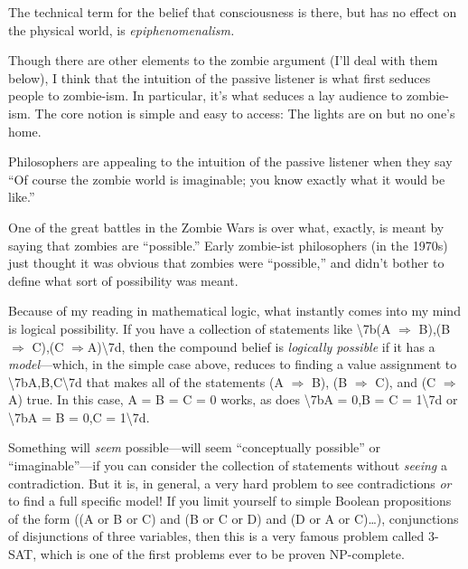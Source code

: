 {
 The technical term for the belief that consciousness is there, but
has no effect on the physical world, is \textit{epiphenomenalism.}}

{
 Though there are other elements to the zombie argument
(I'll deal with them below), I think that the intuition
of the passive listener is what first seduces people to zombie-ism. In
particular, it's what seduces a lay audience to
zombie-ism. The core notion is simple and easy to access: The lights
are on but no one's home.}

{
 Philosophers are appealing to the intuition of the passive
listener when they say ``Of course the zombie world is
imaginable; you know exactly what it would be
like.''}

{
 One of the great battles in the Zombie Wars is over what, exactly,
is meant by saying that zombies are
``possible.'' Early zombie-ist
philosophers (in the 1970s) just thought it was obvious that zombies
were ``possible,'' and
didn't bother to define what sort of possibility was
meant.}

{
 Because of my reading in mathematical logic, what instantly comes
into my mind is logical possibility. If you have a collection of
statements like {\textbackslash}{\textquotesingle}7b(A $\Rightarrow $
B),(B $\Rightarrow $ C),(C $\Rightarrow
${\textlnot}A){\textbackslash}{\textquotesingle}7d, then the compound
belief is \textit{logically possible} if it has a
\textit{model}{}---which, in the simple case above, reduces to finding
a value assignment to
{\textbackslash}{\textquotesingle}7bA,B,C{\textbackslash}{\textquotesingle}7d
that makes all of the statements (A $\Rightarrow $ B), (B $\Rightarrow
$ C), and (C $\Rightarrow ${\textlnot}A) true. In this case, A = B = C
= 0 works, as does {\textbackslash}{\textquotesingle}7bA = 0,B = C =
1{\textbackslash}{\textquotesingle}7d or
{\textbackslash}{\textquotesingle}7bA = B = 0,C =
1{\textbackslash}{\textquotesingle}7d.}

{
 Something will \textit{seem} possible---will seem
``conceptually possible'' or
``imaginable''---if you can consider
the collection of statements without \textit{seeing} a contradiction.
But it is, in general, a very hard problem to see contradictions
\textit{or} to find a full specific model! If you limit yourself to
simple Boolean propositions of the form ((A or B or C) and (B or
{\textlnot}C or D) and (D or {\textlnot}A or {\textlnot}C){\dots}),
conjunctions of disjunctions of three variables, then this is a very
famous problem called 3-SAT, which is one of the first problems ever to
be proven NP-complete.}

